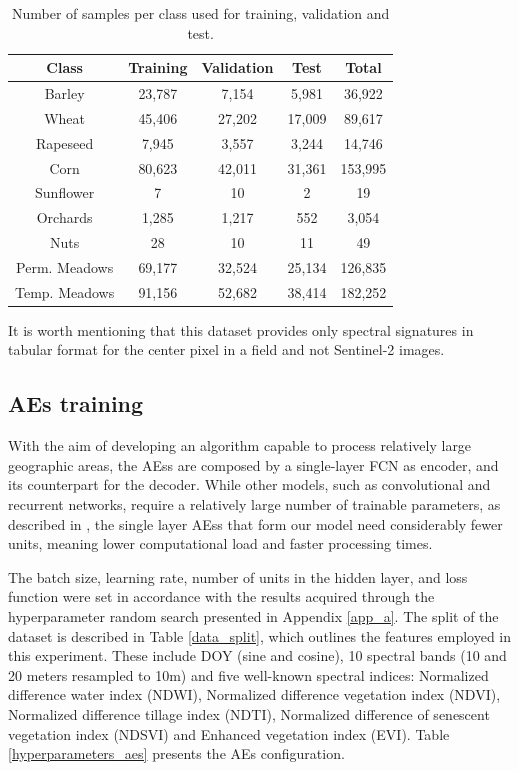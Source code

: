 \documentclass[journal,article,submit,pdftex,moreauthors]{Definitions/mdpi}
\begin{document}
\begin{table}[H]
	\centering
	\caption{Number of samples per class used for training, validation and test.}
	\small
	\begin{tabular}{c c c c c}
		\hline
		Class			& Training		& Validation 	& Test 		& Total \\
		\hline
		Barley			& 23,787		& 7,154			& 5,981		& 36,922 \\
		Wheat			& 45,406		& 27,202		& 17,009	& 89,617 \\
		Rapeseed		& 7,945			& 3,557			& 3,244		& 14,746 \\
		Corn			& 80,623		& 42,011		& 31,361	& 153,995 \\
		Sunflower		& 7				& 10			& 2			& 19 \\
		Orchards		& 1,285			& 1,217			& 552		& 3,054 \\
		Nuts			& 28			& 10			& 11		& 49 \\
		Perm. Meadows	& 69,177		& 32,524		& 25,134	& 126,835 \\
		Temp. Meadows	& 91,156		& 52,682		& 38,414	& 182,252 \\
		\hline
	\end{tabular}
	\label{samples}
\end{table}
It is worth mentioning that this dataset provides only spectral signatures in tabular format for the center pixel in a field and not Sentinel-2 images. 
\subsection{\ac{AEs} training}
With the aim of developing an algorithm capable to process relatively large geographic areas, the \acp{AE}s are composed by a single-layer \ac{FCN} as encoder, and its counterpart for the decoder.
While other models, such as convolutional and recurrent networks, require a relatively large number of trainable parameters, as described in \cite{Paris2020,Chen2022,Russwurm2020}, the single layer \acp{AE}s that form our model need considerably fewer units, meaning lower computational load and faster processing times.

The batch size, learning rate, number of units in the hidden layer, and loss function were set in accordance with the results acquired through the hyperparameter random search presented in Appendix \ref{app_a}.
The split of the dataset is described in Table \ref{data_split}, which outlines the features employed in this experiment. These include \ac{DOY} (sine and cosine), 10 spectral bands (10 and 20 meters resampled to 10m) and five well-known spectral indices: Normalized difference water index (NDWI), Normalized difference vegetation index (NDVI), Normalized difference tillage index (NDTI), Normalized difference of senescent vegetation index (NDSVI) and Enhanced vegetation index (EVI). Table \ref{hyperparameters_aes} presents the \ac{AEs} configuration.
\end{document}
